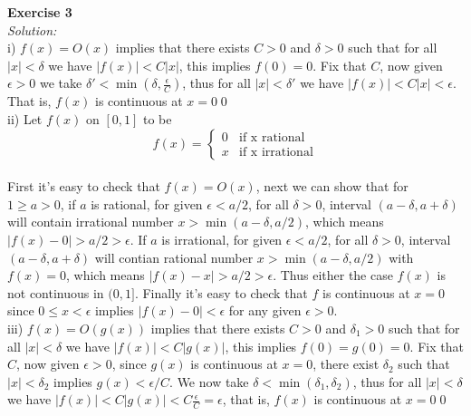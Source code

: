 \documentclass[12pt]{article}
\begin{document}
{\bf Exercise 3}\\
{\it Solution:}\\
i) $f(x)=O(x)$ implies that there exists $C>0$ and $\delta>0$ such that for all $|x|<\delta$ we have $|f(x)|<C|x|$, this implies $f(0)=0$. Fix that $C$, now given $\epsilon>0$ we take $\delta'<\min(\delta, \displaystyle\frac{\epsilon}{C})$, thus for all $|x|<\delta'$ we have $|f(x)|<C|x|<\epsilon$. That is, $f(x)$ is continuous at $x=0$\qed\\
ii) Let $f(x)$ on $[0,1]$ to be
\begin{equation*}
    f(x)=
   \begin{cases}
   0 &\mbox{if x rational}\\
   x &\mbox{if x irrational} 
  \end{cases}
\end{equation*}
\medskip\\
First it's easy to check that $f(x)=O(x)$, next we can show that for $1\ge a>0$,  if $a$ is rational, for given $\epsilon<a/2$, for all $\delta>0$, interval $(a-\delta, a+\delta)$ will contain irrational number $x>\min(a-\delta, a/2)$, which means $|f(x)-0|>a/2>\epsilon$. If $a$ is irrational, for given $\epsilon<a/2$, for all $\delta>0$, interval $(a-\delta, a+\delta)$ will contian rational number $x>\min(a-\delta,a/2)$ with $f(x)=0$, which means $|f(x)-x|>a/2>\epsilon$. Thus either the case $f(x)$ is not continuous in $(0,1]$.  Finally it's easy to check that $f$ is continuous at $x=0$ since $0\leq x<\epsilon$ implies $|f(x)-0|<\epsilon$ for any given $\epsilon>0$.\\
iii) $f(x)=O(g(x))$ implies that there exists $C>0$ and $\delta_1>0$ such that for all $|x|<\delta$ we have $|f(x)|<C|g(x)|$, this implies $f(0)=g(0)=0$. Fix that $C$, now given $\epsilon>0$, since $g(x)$ is continuous at $x=0$, there exist $\delta_2$ such that $|x|<\delta_2$ implies $g(x)<\epsilon/C$. We now take $\delta<\min(\delta_1, \delta_2)$, thus for all $|x|<\delta$ we have $|f(x)|<C|g(x)|<C\displaystyle\frac{\epsilon}{C}=\epsilon$, that is, $f(x)$ is continuous at $x=0$\qed\\
\end{document}
